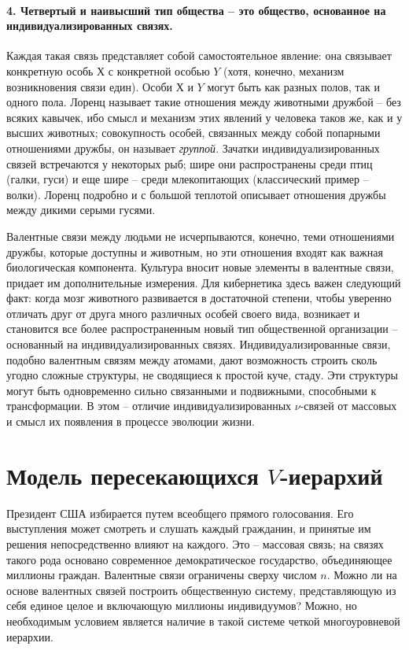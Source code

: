 \documentclass{book}
\begin{document}
\paragraph{4. Четвертый и наивысший тип общества -- это общество, основанное на индивидуализированных связях.} Каждая такая 
связь представляет собой самостоятельное явление: она связывает конкретную особь $Х$  с конкретной особью $Y$  (хотя, конечно, 
механизм возникновения связи един). Особи $Х$  и $Y$  могут быть как разных полов, так и одного пола. Лоренц называет такие 
отношения между животными дружбой -- без всяких кавычек, ибо смысл и механизм этих явлений у человека таков же, как и у высших 
животных; совокупность особей, связан­ных между собой попарными отношениями дружбы, он называет \textit{группой}.  Зачатки 
индивидуализированных связей встречаются у некоторых рыб; шире они распространены среди птиц (галки, гуси) и еще шире -- среди 
млекопитающих (классический пример -- волки). Лоренц подробно и с большой теплотой описывает отношения дружбы между дикими 
серыми гусями.

Валентные связи между людьми не исчерпываются, конеч­но, теми отношениями дружбы, которые доступны и животным, но эти отношения входят как важная биологическая компонен­та. Культура вносит новые элементы в валентные связи, при­дает им дополнительные измерения. Для кибернетика здесь ва­жен следующий факт: когда мозг животного развивается в до­статочной степени, чтобы уверенно отличать друг от друга много различных особей своего вида, возникает и становится все бо­лее распространенным новый тип общественной организации -- основанный на индивидуализированных связях. Индивидуали­зированные связи, подобно валентным связям между атомами, дают возможность строить сколь угодно сложные структуры, не сводящиеся к простой куче, стаду. Эти структуры могут быть одновременно сильно связанными и подвижными, способ­ными к трансформации. В этом -- отличие индивидуализирован­ных $\nu$-связей  от массовых и смысл их появления в процессе эволюции жизни.


\section{Модель пересекающихся $V$-иерархий}

Президент США избирается путем всеобщего прямого голо­сования. Его выступления может смотреть и слушать каждый гражданин, и принятые им решения непосредственно влияют на каждого. Это -- массовая связь; на связях такого рода осно­вано современное демократическое государство, объединяющее миллионы граждан. Валентные связи ограничены сверху числом $n$.  Можно ли на основе валентных связей построить общест­венную систему, представляющую из себя единое целое и вклю­чающую миллионы индивидуумов? Можно, но необходимым условием является наличие в такой системе четкой многоуров­невой иерархии.
\end{document}
